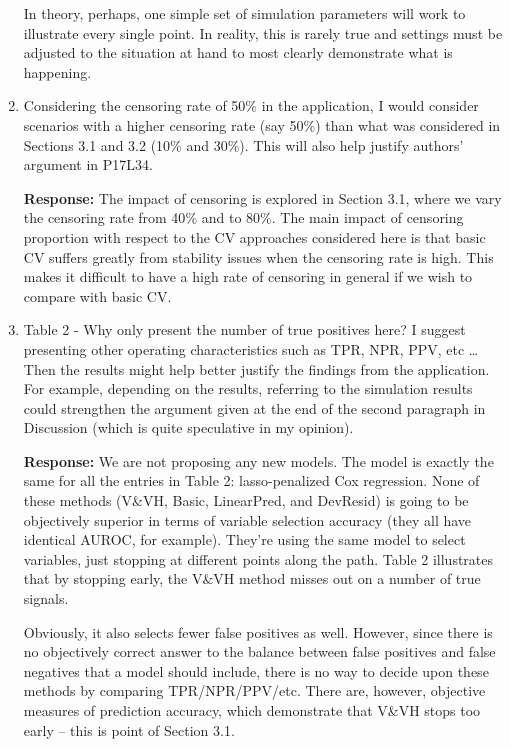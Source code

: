 \documentclass[12]{article}
\newcommand{\re}{\textbf{Response: }}
\begin{document}
\begin{enumerate}[align = left]
  In theory, perhaps, one simple set of simulation parameters will work to illustrate every single point. In reality, this is rarely true and settings must be adjusted to the situation at hand to most clearly demonstrate what is happening.

\item Considering the censoring rate of 50$\%$ in the application, I would consider scenarios with a higher censoring rate (say 50$\%$) than what was considered in Sections 3.1 and 3.2 (10$\%$ and 30$\%$). This will also help justify authors’ argument in P17L34.

  \re The impact of censoring is explored in Section 3.1, where we vary the censoring rate from 40$\%$ and to 80$\%$. The main impact of censoring proportion with respect to the CV approaches considered here is that basic CV suffers greatly from stability issues when the censoring rate is high. This makes it difficult to have a high rate of censoring in general if we wish to compare with basic CV.

\item Table 2 - Why only present the number of true positives here? I suggest presenting other operating characteristics such as TPR, NPR, PPV, etc \ldots Then the results might help better justify the findings from the application. For example, depending on the results, referring to the simulation results could strengthen the argument given at the end of the second paragraph in Discussion (which is quite speculative in my opinion).

  \re We are not proposing any new models. The model is exactly the same for all the entries in Table 2: lasso-penalized Cox regression. None of these methods (V\&VH, Basic, LinearPred, and DevResid) is going to be objectively superior in terms of variable selection accuracy (they all have identical AUROC, for example). They're using the same model to select variables, just stopping at different points along the path. Table 2 illustrates that by stopping early, the V\&VH method misses out on a number of true signals.

  Obviously, it also selects fewer false positives as well. However, since there is no objectively correct answer to the balance between false positives and false negatives that a model should include, there is no way to decide upon these methods by comparing TPR/NPR/PPV/etc. There are, however, objective measures of prediction accuracy, which demonstrate that V\&VH stops too early -- this is point of Section 3.1.


\end{enumerate}
\end{document}
